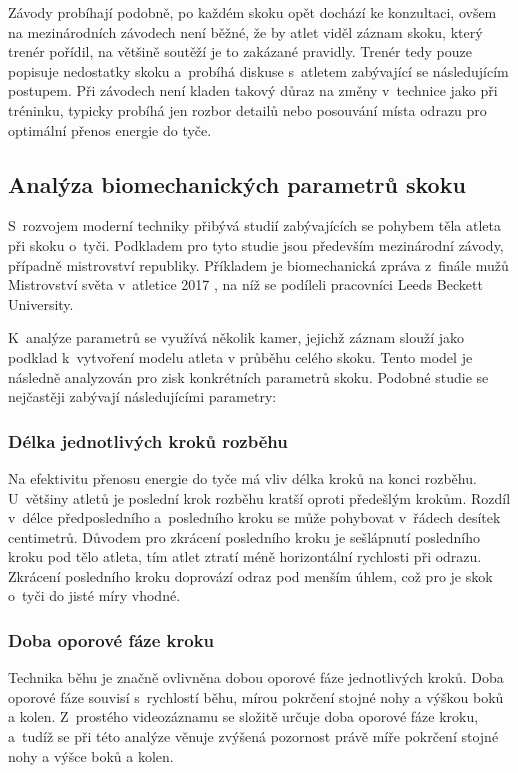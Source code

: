 Závody probíhají podobně, po každém skoku opět dochází ke konzultaci, ovšem na mezinárodních závodech není běžné, že by atlet viděl záznam skoku, který trenér pořídil, na většině soutěží je to zakázané pravidly. Trenér tedy pouze popisuje nedostatky skoku a~probíhá diskuse s~atletem zabývající se následujícím postupem. Při závodech není kladen takový důraz na změny v~technice jako při tréninku, typicky probíhá jen rozbor detailů nebo posouvání místa odrazu pro optimální přenos energie do tyče.

\subsection{Analýza biomechanických parametrů skoku}
\label{ssec:parametry}

S~rozvojem moderní techniky přibývá studií zabývajících se pohybem těla atleta při skoku o~tyči. Podkladem pro tyto studie jsou především mezinárodní závody, případně mistrovství republiky. Příkladem je biomechanická zpráva z~finále mužů Mistrovství světa v~atletice 2017 \citep{IAAF2017}, na níž se podíleli pracovníci Leeds Beckett University.

K~analýze parametrů se využívá několik kamer, jejichž záznam slouží jako podklad k~vytvoření modelu atleta v průběhu celého skoku. Tento model je následně analyzován pro zisk konkrétních parametrů skoku. Podobné studie se nejčastěji zabývají následujícími parametry:

\subsubsection{Délka jednotlivých kroků rozběhu}

Na efektivitu přenosu energie do tyče má vliv délka kroků na konci rozběhu. U~většiny atletů je poslední krok rozběhu kratší oproti předešlým krokům. Rozdíl v~délce předposledního a~posledního kroku se může pohybovat v~řádech desítek centimetrů. Důvodem pro zkrácení posledního kroku je sešlápnutí posledního kroku pod tělo atleta, tím atlet ztratí méně horizontální rychlosti při odrazu. Zkrácení posledního kroku doprovází odraz pod menším úhlem, což pro je skok o~tyči do jisté míry vhodné.

\subsubsection{Doba oporové fáze kroku}

Technika běhu je značně ovlivněna dobou oporové fáze jednotlivých kroků. Doba oporové fáze souvisí s~rychlostí běhu, mírou pokrčení stojné nohy a výškou boků a kolen. Z~prostého videozáznamu se složitě určuje doba oporové fáze kroku, a~tudíž se při této analýze věnuje zvýšená pozornost právě míře pokrčení stojné nohy a výšce boků a kolen.

